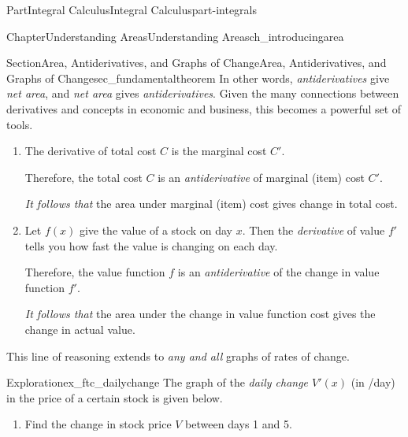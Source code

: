 \documentclass[oneside,10pt,]{tufte-book}
\numberwithin{equation}{chapter}
\begin{document}
\begin{partptx}{Part}{Integral Calculus}{}{Integral Calculus}{}{}{part-integrals}
\begin{chapterptx}{Chapter}{Understanding Areas}{}{Understanding Areas}{}{}{ch_introducingarea}
\begin{sectionptx}{Section}{Area, Antiderivatives, and Graphs of Change}{}{Area, Antiderivatives, and Graphs of Change}{}{}{sec_fundamentaltheorem}
In other words, \emph{antiderivatives} give \emph{net area}, and \emph{net area} gives \emph{antiderivatives}. Given the many connections between derivatives and concepts in economic and business, this becomes a powerful set of tools.%
\par
%
\begin{enumerate}
\item{}The derivative of total cost \(C\) is the marginal cost \(C'\).%
\par
Therefore, the total cost \(C\) is an \emph{antiderivative} of marginal (item) cost \(C'\).%
\par
\emph{It follows that} the area under marginal (item) cost gives change in total cost.%
\item{}Let \(f(x)\) give the value of a stock on day \(x\).  Then the \emph{derivative} of value \(f'\) tells you how fast the value is changing on each day.%
\par
Therefore, the value function \(f\) is an \emph{antiderivative} of the change in value function \(f'\).%
\par
\emph{It follows that} the area under the change in value function cost gives the change in actual value.%
\end{enumerate}
%
\par
This line of reasoning extends to \emph{any and all} graphs of rates of change.%
\begin{exploration}{Exploration}{}{ex_ftc_dailychange}%
The graph of the \emph{daily change \(V'(x)\)} (in \textdollar{}\slash{}day) in the price of a certain stock is given below.%
\begin{image}{0.125}{0.75}{0.125}{}%
%
\end{image}%
\begin{enumerate}[font=\bfseries,label=(\alph*),ref=\alph*]%
\item{}Find the change in stock price \(V\) between days 1 and 5.%

\end{enumerate}
\end{exploration}
\end{sectionptx}
\end{chapterptx}
\end{partptx}
\end{document}
